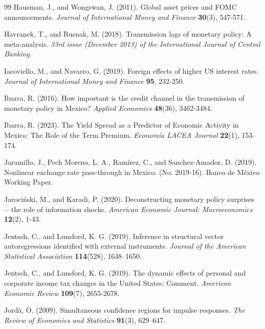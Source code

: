 \documentclass[12pt, reqno]{article}
\begin{document}
\begin{thebibliography}{99}
\bibitem{} \hypertarget{Hausman and Wongswan (2011)}{}Hausman, J., and Wongswan, J. (2011). Global asset prices and FOMC announcements. \textit{Journal of International Money and Finance} \textbf{30}(3), 547-571.

\bibitem{} \hypertarget{Havranek and Rusnak (2018)}{} Havranek, T., and Rusnak, M. (2018). Transmission lags of monetary policy: A meta-analysis. \textit{33rd issue (December 2013) of the International Journal of Central Banking}.

\bibitem{} \hypertarget{Iacoviello and Navarro (2019)}{} Iacoviello, M., and Navarro, G. (2019). Foreign effects of higher US interest rates. \textit{Journal of International Money and Finance} \textbf{95}, 232-250.

\bibitem{} \hypertarget{Ibarra (2016)}{}Ibarra, R. (2016). How important is the credit channel in the transmission of monetary policy in Mexico? \textit{Applied Economics} \textbf{48}(36), 3462-3484.

\bibitem{} \hypertarget{Ibarra (2023)}{}
Ibarra, R. (2023). The Yield Spread as a Predictor of Economic Activity in Mexico: The Role of the Term Premium. \textit{Economía LACEA Journal} \textbf{22}(1), 153–174.

\bibitem{} \hypertarget{Jaramillo et al. (2019)}{}Jaramillo, J., Pech Moreno, L. A., Ramírez, C., and Sanchez-Amador, D. (2019). Nonlinear exchange rate pass-through in Mexico. (No. 2019-16). Banco de México Working Paper.

\bibitem{} \hypertarget{JK (2020)}{} Jarociński, M., and Karadi, P. (2020). Deconstructing monetary policy surprises—the role of information shocks. \textit{American Economic Journal: Macroeconomics} \textbf{12}(2), 1-43.

\bibitem{} \hypertarget{Jentsch and Lunsford (2019)}{}
Jentsch, C., and Lunsford, K. G. (2019). Inference in structural vector autoregressions identified with external instruments. \textit{Journal of the American Statistical Association} \textbf{114}(528), 1638–1650.

\bibitem{} \hypertarget{Jentsch and Lunsford (2019b)}{} 
Jentsch, C., and Lunsford, K. G. (2019). The dynamic effects of personal and corporate income tax changes in the United States: Comment. \textit{American Economic Review} \textbf{109}(7), 2655-2678.

\bibitem{} \hypertarget{Jorda (2009)}{}
Jordà, Ò. (2009). Simultaneous confidence regions for impulse responses. \textit{The Review of Economics and Statistics} \textbf{91}(3), 629–647.


\end{thebibliography}
\end{document}
